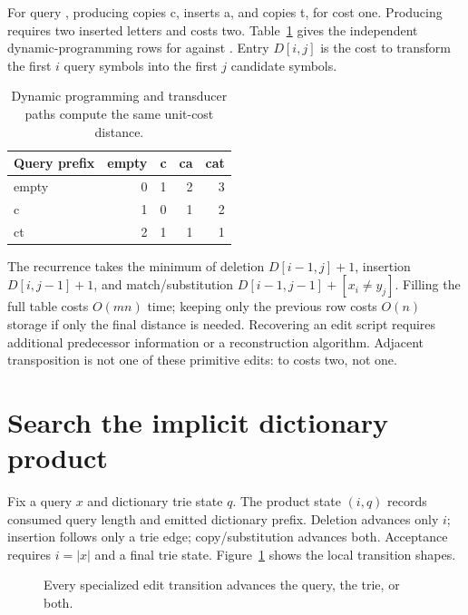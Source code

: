 For query , producing  copies c, inserts a, and copies t, for cost one.
Producing  requires two inserted letters and costs two.
Table~\ref{tab:ch79-distance} gives the independent dynamic-programming rows for  against .
Entry $D[i,j]$ is the cost to transform the first $i$ query symbols into the first $j$ candidate symbols.

\begin{table}[htbp]
\caption{Dynamic programming and transducer paths compute the same unit-cost distance.}
\label{tab:ch79-distance}
\centering
\begin{tabular}{lrrrr}
\toprule
Query prefix & empty & c & ca & cat \\
\midrule
empty & 0 & 1 & 2 & 3 \\
c & 1 & 0 & 1 & 2 \\
ct & 2 & 1 & 1 & 1 \\
\bottomrule
\end{tabular}
\end{table}

The recurrence takes the minimum of deletion $D[i-1,j]+1$, insertion $D[i,j-1]+1$, and match/substitution $D[i-1,j-1]+[x_i\ne y_j]$.
Filling the full table costs $O(mn)$ time; keeping only the previous row costs $O(n)$ storage if only the final distance is needed.
Recovering an edit script requires additional predecessor information or a reconstruction algorithm.
Adjacent transposition is not one of these primitive edits:  to  costs two, not one.

\section{Search the implicit dictionary product}
\label{sec:ch79-search}
Fix a query $x$ and dictionary trie state $q$.
The product state $(i,q)$ records consumed query length and emitted dictionary prefix.
Deletion advances only $i$; insertion follows only a trie edge; copy/substitution advances both.
Acceptance requires $i=|x|$ and a final trie state.
Figure~\ref{fig:ch79-product} shows the local transition shapes.

\begin{figure}[htbp]
\centering
{}
\caption{Every specialized edit transition advances the query, the trie, or both.}
\label{fig:ch79-product}
\end{figure}

